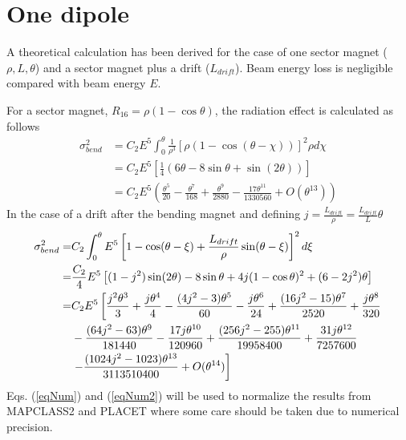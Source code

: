 \section{One dipole}
A theoretical calculation has been derived for the case of one sector magnet ($\rho,L,\theta$) and a sector magnet plus a drift ($L_{drift}$). Beam energy loss is negligible compared with beam energy $E$.\par
For a sector magnet, $R_{16}= \rho(1-\cos\theta)$, the radiation effect is calculated as follows
\begin{align}
\sigma_{bend}^2 &= C_2 E^5\int_0^\theta \frac{1}{\rho^3}[\rho(1-\cos(\theta-\chi))]^2\rho d\chi\\
&= C_2E^5\left[\frac{1}{4}(6\theta-8\sin\theta+\sin(2\theta))\right]\label{eqNum}\\
&=C_2E^5\left(\frac{\theta^5}{20}-\frac{\theta^7}{168}+\frac{\theta^9}{2880}-\frac{17\theta^{11}}{1330560}+O(\theta^{13})\right)
\end{align} 
 In the case of a drift after the bending magnet and defining $j=\frac{L_{drift}}{\rho}=\frac{L_{drift}}{L}\theta$
\begin{align}
  \sigma_{bend}^2 =& C_2 \int_0^\theta E^5\left[1-\cos(\theta-\xi)+\frac{L_{drift}}{\rho}\sin(\theta-\xi)\right]^2 d\xi\\
 =& \frac{C_2}{4} E^5 \left[(1-j^2)\sin(2\theta)-8\sin\theta+4j(1-\cos\theta)^2+(6-2j^2)\theta\right]\label{eqNum2}\\
  =& C_2 E^5 \left[\frac{j^2\theta^3}{3}+\frac{j\theta^4}{4}-\frac{(4j^2-3)\theta^5}{60}- \frac{j\theta^6}{24} +\frac{(16j^2-15)\theta^7}{2520}+\frac{j\theta^8}{320}\right.\notag\\
    &-\frac{(64j^2-63)\theta^9}{181440}-\frac{17j\theta^{10}}{120960}+\frac{(256j^2-255)\theta^{11}}{19958400}+\frac{31j\theta^{12}}{7257600}\notag\\
    &\left.-\frac{(1024j^2-1023)\theta^{13}}{3113510400}+O(\theta^{14})\right]
\end{align}
Eqs. (\ref{eqNum}) and (\ref{eqNum2}) will be used to normalize the results from MAPCLASS2 and PLACET \cite{Placet} where some care should be taken due to numerical precision.\par
